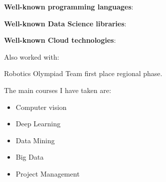 
\textbf{Well-known programming languages}:
\begin{center}
\end{center}
\divider{}

\textbf{Well-known Data Science libraries}:
\begin{center}
\end{center}
\divider{}

\textbf{Well-known Cloud technologies}:
\begin{center}
\end{center}
\divider{}

Also worked with:
\begin{center}
\end{center}
\divider{}


\cvachievement{\faTrophy}
{Robotics Olympiad \smallskip}
{\small{}%
  \small{}}
Team first place regional phase.

\medskip

The main courses I have taken are:
\begin{itemize}
  \item Computer vision
  \item Deep Learning
  \item Data Mining
  \item Big Data
  \item Project Management
\end{itemize}


